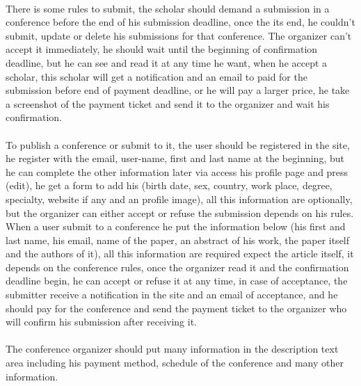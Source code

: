 		\paragraph{}
		There is some rules to submit, the scholar should demand a submission in a conference before the end of his submission deadline, once the its end, he couldn't submit, update or delete his submissions for that conference. The organizer can't accept it immediately, he should wait until the beginning of confirmation deadline, but he can see and read it at any time he want, when he accept a scholar, this scholar will get a notification and an email to paid for the submission before end of payment deadline, or he will pay a larger price, he take a screenshot of the payment ticket and send it to the organizer and wait his confirmation.
		\paragraph{}
		To publish a conference or submit to it, the user should be registered in the site, he register with the email, user-name, first and last name at the beginning, but he can complete the other information later via access his profile page and press (edit), he get a form to add his (birth date, sex, country, work place, degree, specialty, website if any and an profile image), all this information are optionally, but the organizer can either accept or refuse the submission depends on his rules. When a user submit to a conference he put the information below (his first and last name, his email, name of the paper, an abstract of his work, the paper itself and the authors of it), all this information are required expect the article itself, it depends on the conference rules, once the organizer read it and the confirmation deadline begin, he can accept or refuse it at any time, in case of acceptance, the submitter receive a notification in the site and an email of acceptance, and he should pay for the conference and send the payment ticket to the organizer who will confirm his submission after receiving it.
		\paragraph{}
		The conference organizer should put many information in the description text area including his payment method, schedule of the conference and many other information.
		
		